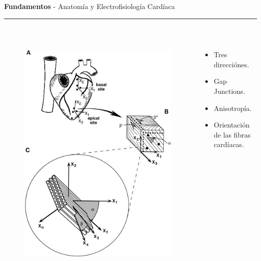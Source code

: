 \documentclass[11pt]{beamer}
\begin{document}
	\begin{frame}[t]
		\vspace*{0.5 cm} \textbf{Fundamentos} - Anatomía y Electrofisiología Cardíaca \\
		\color{brown}\rule{\linewidth}{4pt} \\ [0.5 cm]
		\begin{columns}[T] %
			\begin{column}{.48\textwidth}
				\begin{figure}[H]
					\centering
					\includegraphics[height = 5 cm]{fig/fundamentals-direccionmiocitos}
				\end{figure}			
				\end{column}%
				\hfill%
				\begin{column}{.48\textwidth}
					\begin{itemize}
						\item Tres direcciónes.
						\item Gap Junctions.
						\item Anisotropía.
						\item Orientación de las fibras cardíacas.
					\end{itemize}
				\end{column}%
			\end{columns}	
		
	\end{frame}

	
\end{document}
